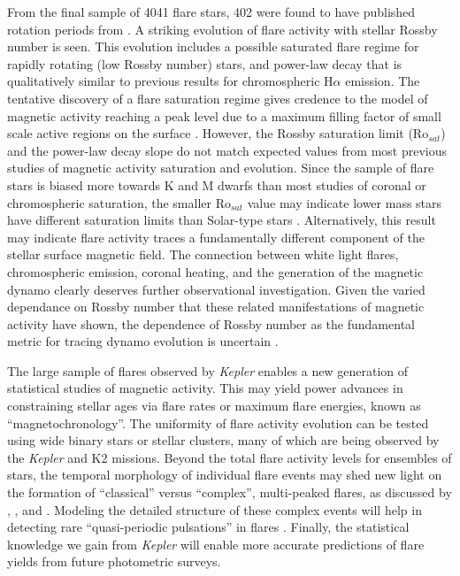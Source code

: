 \documentclass[twocolumn]{aastex6}
\newcommand{\Kepler}{\textsl{Kepler}\xspace}
\begin{document}
From the final sample of 4041 flare stars, 402 were found to have published rotation periods from \citet{mcquillan2014}.
 A striking evolution of flare activity with stellar Rossby number is seen. This evolution includes a possible saturated flare regime for rapidly rotating (low Rossby number) stars, and power-law decay that is qualitatively similar to previous results for chromospheric H$\alpha$ emission. The tentative discovery of a flare saturation regime gives credence to the model of magnetic activity reaching a peak level due to a maximum filling factor of small scale active regions on the surface \citep{vilhu1984}. However, the Rossby saturation limit (Ro$_{sat}$) and the power-law decay slope do not match expected values from most previous studies of magnetic activity saturation and evolution. Since the sample of flare stars is biased more towards K and M dwarfs than most studies of coronal or chromospheric saturation, the smaller Ro$_{sat}$ value may indicate lower mass stars have different saturation limits than Solar-type stars \citep{west2009}. Alternatively, this result may indicate flare activity traces a fundamentally different component of the stellar surface magnetic field. The connection between white light flares, chromospheric emission, coronal heating, and the generation of the magnetic dynamo clearly deserves further observational investigation. Given the varied dependance on Rossby number that these related manifestations of magnetic activity have shown, the dependence of Rossby number as the fundamental metric for tracing dynamo evolution is uncertain \citep{basri1986,stepien1994}.


The large sample of flares observed by \Kepler enables a new generation of statistical studies of magnetic activity. This may yield power advances in constraining stellar ages via flare rates or maximum flare energies, known as ``magnetochronology''. The uniformity of flare activity evolution can be tested using wide binary stars or stellar clusters, many of which are being observed by the \Kepler and K2 missions. 
Beyond the total flare activity levels for ensembles of stars, the temporal morphology of individual flare events may shed new light on the formation of ``classical'' versus ``complex'', multi-peaked flares, as discussed by \citet{davenport2014b}, \citet{balona2015}, and \citet{davenport2015c}. Modeling the detailed structure of these complex events will help in detecting rare ``quasi-periodic pulsations'' in flares \citep{pugh2015}.
Finally, the statistical knowledge we gain from \Kepler will enable more accurate predictions of flare yields from future photometric surveys. 
\end{document}
